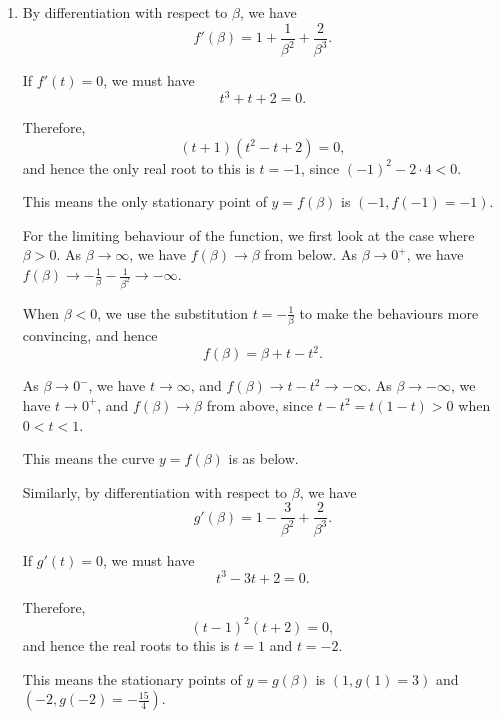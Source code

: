 \Question{\currfilebase}

\begin{enumerate}
    \item By differentiation with respect to \(\beta\), we have
          \[
              f'(\beta) = 1 + \frac{1}{\beta^2} + \frac{2}{\beta^3}.
          \]

          If \(f'(t) = 0\), we must have
          \[
              t^3 + t + 2 = 0.
          \]

          Therefore,
          \[
              (t + 1)(t^2 - t + 2) = 0,
          \]
          and hence the only real root to this is \(t = -1\), since \((-1)^2 - 2 \cdot 4 < 0\).

          This means the only stationary point of \(y = f(\beta)\) is \((-1, f(-1) = -1)\).

          For the limiting behaviour of the function, we first look at the case where \(\beta > 0\). As \(\beta \to \infty\), we have \(f(\beta) \to \beta\) from below. As \(\beta \to 0^{+}\), we have \(f(\beta) \to -\frac{1}{\beta} - \frac{1}{\beta^2} \to -\infty\).

          When \(\beta < 0\), we use the substitution \(t = -\frac{1}{\beta}\) to make the behaviours more convincing, and hence
          \[
              f(\beta) = \beta + t - t^2.
          \]

          As \(\beta \to 0^{-}\), we have \(t \to \infty\), and \(f(\beta) \to t - t^2 \to -\infty\). As \(\beta \to -\infty\), we have \(t \to 0^{+}\), and \(f(\beta) \to \beta\) from above, since \(t - t^2 = t (1 - t) > 0\) when \(0 < t < 1\).

          This means the curve \(y = f(\beta)\) is as below.

          \begin{center}
              
          \end{center}

          Similarly, by differentiation with respect to \(\beta\), we have
          \[
              g'(\beta) = 1 - \frac{3}{\beta^2} + \frac{2}{\beta^3}.
          \]

          If \(g'(t) = 0\), we must have
          \[
              t^3 - 3t + 2 = 0.
          \]

          Therefore,
          \[
              (t - 1)^2(t + 2) = 0,
          \]
          and hence the real roots to this is \(t = 1\) and \(t = -2\).

          This means the stationary points of \(y = g(\beta)\) is \((1, g(1) = 3)\) and \((-2, g(-2) = -\frac{15}{4})\).


\end{enumerate}
